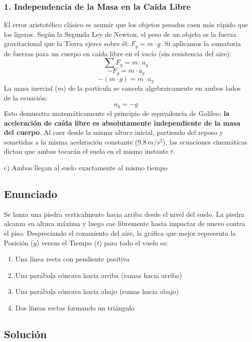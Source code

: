 \documentclass[12pt, a4paper]{article}
\begin{document}
\subsubsection*{1. Independencia de la Masa en la Caída Libre}
El error aristotélico clásico es asumir que los objetos pesados caen más rápido que los ligeros.
Según la Segunda Ley de Newton, el peso de un objeto es la fuerza gravitacional que la Tierra ejerce sobre él: $F_g = m \cdot g$.
Si aplicamos la sumatoria de fuerzas para un cuerpo en caída libre en el vacío (sin resistencia del aire):
$$ \sum F_y = m \cdot a_y $$
$$ -F_g = m \cdot a_y $$
$$ -(m \cdot g) = m \cdot a_y $$
La masa inercial ($m$) de la partícula se cancela algebraicamente en ambos lados de la ecuación:
$$ a_y = -g $$
Esto demuestra matemáticamente el principio de equivalencia de Galileo: \textbf{la aceleración de caída libre es absolutamente independiente de la masa del cuerpo}. Al caer desde la misma altura inicial, partiendo del reposo y sometidas a la misma aceleración constante ($9.8\,\si{m/s^2}$), las ecuaciones cinemáticas dictan que ambas tocarán el suelo en el mismo instante $t$.

\begin{tcolorbox}[colback=green!5!white, colframe=green!50!black, title=Respuesta Final]
\centering \Large c) Ambas llegan al suelo exactamente al mismo tiempo
\end{tcolorbox}

\newpage

\subsection*{Enunciado}
Se lanza una piedra verticalmente hacia arriba desde el nivel del suelo. La piedra alcanza su altura máxima y luego cae libremente hasta impactar de nuevo contra el piso. Despreciando el rozamiento del aire, la gráfica que mejor representa la Posición ($y$) versus el Tiempo ($t$) para todo el vuelo es:
\begin{enumerate}[label=\alph*)]
    \item Una línea recta con pendiente positiva
    \item Una parábola cóncava hacia arriba (ramas hacia arriba)
    \item Una parábola cóncava hacia abajo (ramas hacia abajo)
    \item Dos líneas rectas formando un triángulo
\end{enumerate}

\subsection*{Solución}
\end{document}

